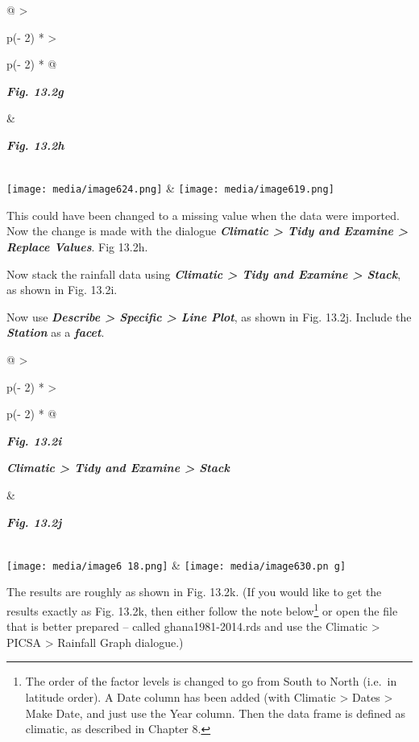 \documentclass[
  letterpaper,
  DIV=11,
  numbers=noendperiod]{scrreprt}
\begin{document}
\begin{longtable}[]{@{}
  >{\raggedright\arraybackslash}p{(\columnwidth - 2\tabcolsep) * }
  >{\raggedright\arraybackslash}p{(\columnwidth - 2\tabcolsep) * }@{}}
\toprule\noalign{}
\begin{minipage}[b]{\linewidth}\raggedright
\textbf{\emph{Fig. 13.2g}}
\end{minipage} & \begin{minipage}[b]{\linewidth}\raggedright
\textbf{\emph{Fig. 13.2h}}
\end{minipage} \\
\midrule\noalign{}
\endhead
\bottomrule\noalign{}
\endlastfoot
\texttt{[image: media/image624.png]} &
\texttt{[image: media/image619.png]} \\
\end{longtable}

This could have been changed to a missing value when the data were
imported. Now the change is made with the dialogue
\textbf{\emph{Climatic \textgreater{} Tidy and Examine \textgreater{}
Replace Values}}. Fig 13.2h.

Now stack the rainfall data using \textbf{\emph{Climatic \textgreater{}
Tidy and Examine \textgreater{} Stack}}, as shown in Fig. 13.2i.

Now use \textbf{\emph{Describe \textgreater{} Specific \textgreater{}
Line Plot}}, as shown in Fig. 13.2j. Include the \textbf{\emph{Station}}
as a \textbf{\emph{facet}}.

\begin{longtable}[]{@{}
  >{\raggedright\arraybackslash}p{(\columnwidth - 2\tabcolsep) * }
  >{\raggedright\arraybackslash}p{(\columnwidth - 2\tabcolsep) * }@{}}
\toprule\noalign{}
\begin{minipage}[b]{\linewidth}\raggedright
\textbf{\emph{Fig. 13.2i}}

\textbf{\emph{Climatic \textgreater{} Tidy and Examine \textgreater{}
Stack}}
\end{minipage} & \begin{minipage}[b]{\linewidth}\raggedright
\textbf{\emph{Fig. 13.2j}}
\end{minipage} \\
\midrule\noalign{}
\endhead
\bottomrule\noalign{}
\endlastfoot
\texttt{[image: media/image6 18.png]}
&
\texttt{[image: media/image630.pn g]} \\
\end{longtable}

The results are roughly as shown in Fig. 13.2k. (If you would like to
get the results exactly as Fig. 13.2k, then either follow the note
below\footnote{The order of the factor levels is changed to go from
  South to North (i.e.~in latitude order). A Date column has been added
  (with Climatic \textgreater{} Dates \textgreater{} Make Date, and just
  use the Year column. Then the data frame is defined as climatic, as
  described in Chapter 8.} or open the file that is better prepared --
called ghana1981-2014.rds and use the Climatic \textgreater{} PICSA
\textgreater{} Rainfall Graph dialogue.)
\end{document}
